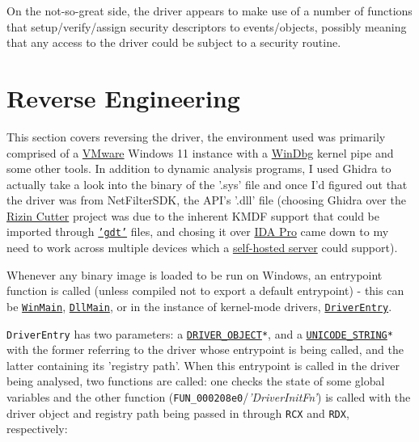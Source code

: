 On the not-so-great side, the driver appears to make use of a number of functions that setup/verify/assign security descriptors to events/objects,
            possibly meaning that any access to the driver could be subject to a security routine.

\section{Reverse Engineering}

This section covers reversing the driver, the environment used was primarily comprised of a
            \href{https://www.vmware.com/uk/products/workstation-pro.html}{VMware} Windows 11 instance
            with a \href{https://learn.microsoft.com/en-us/windows-hardware/drivers/debugger/windbg-overview}{WinDbg} kernel pipe and
            some other tools. In addition to dynamic analysis programs, I used Ghidra to actually take
            a look into the binary of the '.sys' file and once I'd figured out that the driver was from NetFilterSDK, the API's '.dll' file
            (choosing Ghidra over the \href{https://cutter.re/}{Rizin Cutter} project was due to the inherent KMDF support that could be imported through \texttt{\href{https://github.com/0x6d696368/ghidra-data}{'gdt'}} files,
            and chosing it over \href{https://hex-rays.com/ida-pro/}{IDA Pro} came down to my need to work across multiple devices which a \href{https://byte.how/posts/collaborative-reverse-engineering/}{self-hosted server} could support).

Whenever any binary image is loaded to be run on Windows, an entrypoint function is called (unless compiled not to export a default entrypoint) -
            this can be \texttt{\href{https://learn.microsoft.com/en-us/windows/win32/learnwin32/winmain--the-application-entry-point}{WinMain}},
            \texttt{\href{https://learn.microsoft.com/en-us/windows/win32/dlls/dllmain}{DllMain}}, or in the instance
            of kernel-mode drivers, \texttt{\href{https://learn.microsoft.com/en-us/windows-hardware/drivers/wdf/driverentry-for-kmdf-drivers}{DriverEntry}}.

\texttt{DriverEntry} has two parameters: a \texttt{\href{https://learn.microsoft.com/en-us/windows-hardware/drivers/ddi/wdm/ns-wdm-_driver_object}{DRIVER\_OBJECT}*},
            and a \texttt{\href{https://learn.microsoft.com/en-us/windows/win32/api/subauth/ns-subauth-unicode_string}{UNICODE\_STRING}*}
            with the former referring to the driver whose entrypoint is being called, and the latter containing its 'registry path'.
            When this entrypoint is called in the driver being analysed, two functions are called: one checks the state of some global variables
            and the other function (\texttt{FUN\_000208e0}/\textit{'DriverInitFn'}) is called with the driver object and
            registry path being passed in through \texttt{RCX} and \texttt{RDX}, respectively:

